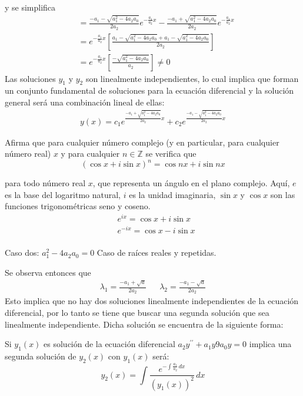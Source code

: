 y se simplifica
\begin{align*}
    &=\frac{ - a_1 - \sqrt{a_1^2 - 4a_2a_0}}{2a_2}e^{ -\frac{a_1}{a_2}x} -\frac{ - a_1 + \sqrt{a_1^2 - 4a_2a_0}}{2a_2}e^{ -\frac{a_1}{a_2}x}\\
    &= e^{ -\frac{a_1}{a_2}x}\left[\frac{ a_1 - \sqrt{a_1^2 - 4a_2a_0} + a_1 - \sqrt{a_1^2 -4a_2a_0}}{2a_2}\right]\\
    &=e^{ -\frac{a_1}{a_2}x}\left[\frac{ - \sqrt{a_1^2 - 4a_2a_0}}{a_2}\right]\neq 0
\end{align*}
Las soluciones $y_1$ y $y_2$ son linealmente independientes, lo cual implica que forman un conjunto fundamental de soluciones para la ecuación diferencial y la solución general será una combinación lineal de ellas:
\begin{align*}
    y(x) = c_1e^{\frac{ -a_1 + \sqrt{a_1^2 - 4a_2a_0}}{2a_2}x} + c_2 e^{\frac{ -a_1 - \sqrt{a_1^2 - 4a_2a_0}}{2a_2}x}
\end{align*}

\begin{definition}
    Afirma que para cualquier número complejo (y en particular, para cualquier número real) $x$ y para cualquier $n\in \mathbb{Z}$ se verifica que
    \begin{equation}
        \left(\cos{x} + i \sin{x}\right)^n = \cos{nx} + i \sin{nx}
    \end{equation}
\end{definition}
\begin{theorem}
    para todo número real $x$, que representa un ángulo en el plano complejo. Aquí, $e$ es la base del logaritmo natural, $i$ es la unidad imaginaria, $\sin{x}$ y $\cos{x}$ son las funciones trigonométricas seno y coseno.
    \begin{align}
        &e^{ix} = \cos{x} + i \sin{x} \\
        &e^{ - ix} = \cos{x} - i \sin{x} \\
    \end{align}
\end{theorem}

Caso dos: $a_1^2-4a_2a_0=0$ Caso de raíces reales y repetidas.

Se observa entonces que 
\begin{align*}
    \lambda_1 = \frac{-a_1 + \sqrt{a}}{2a_2}&&\lambda_2 = \frac{-a_1 -\sqrt{a}}{2a_2} 
\end{align*}
Esto implica que no hay dos soluciones linealmente independientes de la ecuación diferencial, por lo tanto se tiene que buscar una segunda solución que sea linealmente independiente. Dicha solución se encuentra de la siguiente forma:
\begin{theorem}
    Si $y_1(x)$ es solución de la ecuación diferencial $a_2y^{\prime\prime}+a_1y9a_0y=0$ implica una segunda solución de $y_2(x)$ con $y_1(x)$ será:
    \begin{equation}
        y_2(x) = \int \frac{e^{ -\int \frac{a_1}{a_2}\,dx}}{\left(y_1(x)\right)^2}\,dx
    \end{equation}
\end{theorem}


